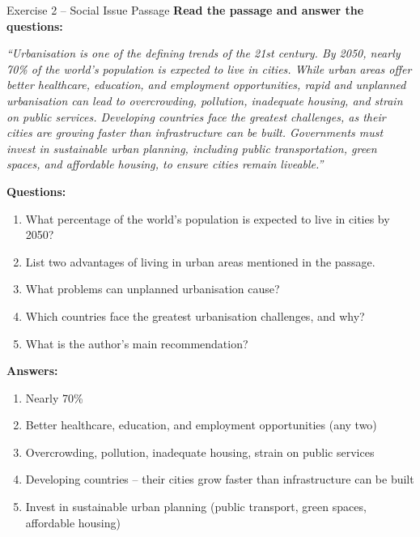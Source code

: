 \documentclass[12pt,a4paper]{article}
\begin{document}
\begin{practicebox}{Exercise 2 -- Social Issue Passage}
\textbf{Read the passage and answer the questions:}

\textit{``Urbanisation is one of the defining trends of the 21st century. By 2050, nearly 70\% of the world's population is expected to live in cities. While urban areas offer better healthcare, education, and employment opportunities, rapid and unplanned urbanisation can lead to overcrowding, pollution, inadequate housing, and strain on public services. Developing countries face the greatest challenges, as their cities are growing faster than infrastructure can be built. Governments must invest in sustainable urban planning, including public transportation, green spaces, and affordable housing, to ensure cities remain liveable.''}

\textbf{Questions:}
\begin{enumerate}[noitemsep]
    \item What percentage of the world's population is expected to live in cities by 2050?
    \item List two advantages of living in urban areas mentioned in the passage.
    \item What problems can unplanned urbanisation cause?
    \item Which countries face the greatest urbanisation challenges, and why?
    \item What is the author's main recommendation?
\end{enumerate}

\textbf{Answers:}
\begin{enumerate}[noitemsep]
    \item Nearly 70\%
    \item Better healthcare, education, and employment opportunities (any two)
    \item Overcrowding, pollution, inadequate housing, strain on public services
    \item Developing countries -- their cities grow faster than infrastructure can be built
    \item Invest in sustainable urban planning (public transport, green spaces, affordable housing)
\end{enumerate}
\end{practicebox}
\end{document}
